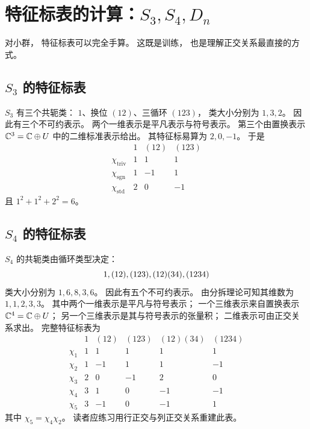 \section{特征标表的计算：$S_3,S_4,D_n$}
对小群， 特征标表可以完全手算。 这既是训练， 也是理解正交关系最直接的方式。
\subsection*{$S_3$ 的特征标表}
$S_3$ 有三个共轭类： $1$、换位 $(12)$、三循环 $(123)$， 类大小分别为 $1,3,2$。 因此有三个不可约表示。 两个一维表示是平凡表示与符号表示。 第三个由置换表示 $\mathbb{C}^3=\mathbb{C}\oplus U$ 中的二维标准表示给出。 其特征标易算为 $2,0,-1$。 于是
\[
\begin{array}{c|ccc}
 & 1 & (12) & (123)\\ \hline
\chi_{\mathrm{triv}} & 1 & 1 & 1\\
\chi_{\mathrm{sgn}} & 1 & -1 & 1\\
\chi_{\mathrm{std}} & 2 & 0 & -1
\end{array}
\]
且 $1^2+1^2+2^2=6$。
\subsection*{$S_4$ 的特征标表}
$S_4$ 的共轭类由循环类型决定：
\[
1,\\ (12),\\ (123),\\ (12)(34),\\ (1234)
\]
类大小分别为 $1,6,8,3,6$。 因此有五个不可约表示。 由分拆理论可知其维数为 $1,1,2,3,3$。 其中两个一维表示是平凡与符号表示； 一个三维表示来自置换表示 $\mathbb{C}^4=\mathbb{C}\oplus U$； 另一个三维表示是其与符号表示的张量积； 二维表示可由正交关系求出。 完整特征标表为
\[
\begin{array}{c|ccccc}
 & 1 & (12) & (123) & (12)(34) & (1234)\\ \hline
\chi_1 & 1 & 1 & 1 & 1 & 1\\
\chi_2 & 1 & -1 & 1 & 1 & -1\\
\chi_3 & 2 & 0 & -1 & 2 & 0\\
\chi_4 & 3 & 1 & 0 & -1 & -1\\
\chi_5 & 3 & -1 & 0 & -1 & 1
\end{array}
\]
其中 $\chi_5=\chi_4\chi_2$。 读者应练习用行正交与列正交关系重建此表。

